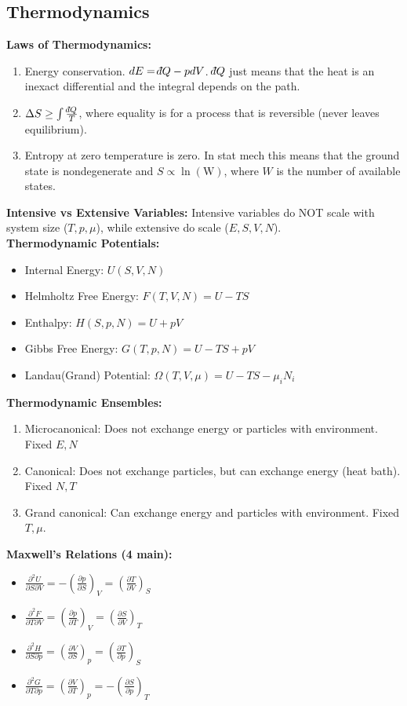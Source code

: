\documentclass[12pt]{extarticle}
\def\dbar{{\mathchar'26\mkern-12mu d}}
\begin{document}
\subsection{Thermodynamics}
\textbf{Laws of Thermodynamics:}
\begin{enumerate}
  \item Energy conservation. $dE = \dbar Q - pdV$. $\dbar Q$ just means that the heat is an inexact differential and the integral depends on the path.
  \item $\Delta S \geq \int \frac{\dbar Q}{T}$, where equality is for a process that is reversible (never leaves equilibrium).
  \item{Entropy at zero temperature is zero. In stat mech this means that the ground state is nondegenerate and $S \propto \ln (\mathrm{W})$, where $W$ is the number of available states.}
\end{enumerate}
\textbf{Intensive vs Extensive Variables:} Intensive variables do NOT scale with system size ($T, p, \mu$), while extensive do scale ($E, S, V, N$). \\
\textbf{Thermodynamic Potentials:}
\begin{itemize}
  \item Internal Energy: $U(S,V,N)$
  \item Helmholtz Free Energy: $F(T,V,N) = U-TS$
  \item Enthalpy: $H(S,p,N) = U+pV$
  \item Gibbs Free Energy: $G(T,p,N) = U-TS+pV$
  \item Landau(Grand) Potential: $\Omega(T,V,\mu) = U-TS-\mu_iN_i$
\end{itemize}
\textbf{Thermodynamic Ensembles:}
\begin{enumerate}
  \item Microcanonical: Does not exchange energy or particles with environment. Fixed $E,N$
  \item Canonical: Does not exchange particles, but can exchange energy (heat bath). Fixed $N,T$
  \item Grand canonical: Can exchange energy and particles with environment. Fixed $T, \mu$.
\end{enumerate}
\textbf{Maxwell's Relations (4 main):}
\begin{itemize}
  \item $\frac{\partial^2 U}{\partial S \partial V} = -\left(\frac{\partial p}{\partial S}\right)_V = \left(\frac{\partial T}{\partial V}\right)_S$
  \item $\frac{\partial^2 F}{\partial T \partial V} = \left(\frac{\partial p}{\partial T}\right)_V = \left(\frac{\partial S}{\partial V}\right)_T$
  \item $\frac{\partial^2 H}{\partial S \partial p} = \left(\frac{\partial V}{\partial S}\right)_p = \left(\frac{\partial T}{\partial p}\right)_S$
  \item $\frac{\partial^2 G}{\partial T \partial p} = \left(\frac{\partial V}{\partial T}\right)_p = -\left(\frac{\partial S}{\partial p}\right)_T$
\end{itemize}
\end{document}
